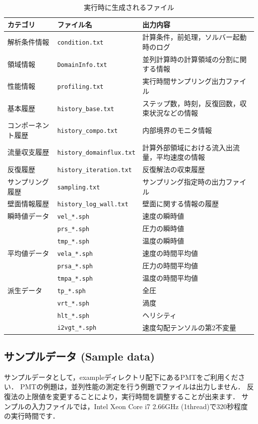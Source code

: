 \documentclass[a4paper,10pt,oneside,fleqn]{jsarticle}
\begin{document}
\begin{table}[htdp]
\caption{実行時に生成されるファイル}
\begin{center}
\small
\begin{tabular}{lll}\toprule
カテゴリ & ファイル名 & 出力内容\\ \midrule
解析条件情報 & \verb|condition.txt| & 計算条件，前処理，ソルバー起動時のログ\\
領域情報 & \verb|DomainInfo.txt| & 並列計算時の計算領域の分割に関する情報\\ 
性能情報 & \verb|profiling.txt| & 実行時間サンプリング出力ファイル\\ \hline
基本履歴 & \verb|history_base.txt| & ステップ数，時刻，反復回数，収束状況などの情報\\
コンポーネント履歴 & \verb|history_compo.txt| & 内部境界のモニタ情報\\
流量収支履歴 & \verb|history_domainflux.txt| & 計算外部領域における流入出流量，平均速度の情報\\
反復履歴 & \verb|history_iteration.txt| & 反復解法の収束履歴\\ 
サンプリング履歴 & \verb|sampling.txt| & サンプリング指定時の出力ファイル\\ 
壁面情報履歴 & \verb|history_log_wall.txt| & 壁面に関する情報の履歴\\ \hline
瞬時値データ & \verb|vel_*.sph| & 速度の瞬時値\\
& \verb|prs_*.sph| & 圧力の瞬時値\\
& \verb|tmp_*.sph| & 温度の瞬時値\\
平均値データ & \verb|vela_*.sph| & 速度の時間平均値\\
& \verb|prsa_*.sph| & 圧力の時間平均値\\
& \verb|tmpa_*.sph| & 温度の時間平均値\\
派生データ & \verb|tp_*.sph| & 全圧\\
& \verb|vrt_*.sph| & 渦度\\
& \verb|hlt_*.sph| & ヘリシティ\\
& \verb|i2vgt_*.sph| & 速度勾配テンソルの第2不変量\\ 
\bottomrule
\end{tabular}
\end{center}
\label{tbl:logfiles}
\end{table}

   

%
\subsection{サンプルデータ (Sample data)}
サンプルデータとして，exampleディレクトリ配下にあるPMTをご利用ください．
PMTの例題は，並列性能の測定を行う例題でファイルは出力しません．
反復法の上限値を変更することにより，実行時間を調整することが出来ます．
サンプルの入力ファイルでは，Intel Xeon Core i7 2.66GHz (1thread)で320秒程度の実行時間です．
   
\end{document}
